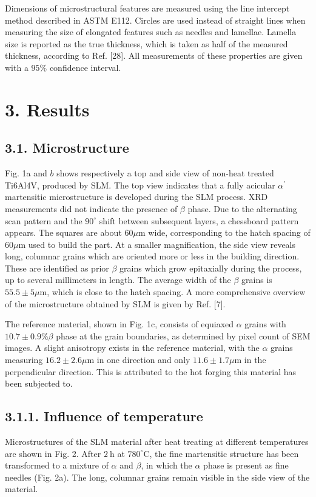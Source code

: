 \documentclass[10pt]{article}
\begin{document}
Dimensions of microstructural features are measured using the line intercept method described in ASTM E112. Circles are used instead of straight lines when measuring the size of elongated features such as needles and lamellae. Lamella size is reported as the true thickness, which is taken as half of the measured thickness, according to Ref. [28]. All measurements of these properties are given with a $95 \%$ confidence interval.

\section*{3. Results}
\subsection*{3.1. Microstructure}
Fig. 1a and $b$ shows respectively a top and side view of non-heat treated Ti6Al4V, produced by SLM. The top view indicates that a fully acicular $\alpha^{\prime}$ martensitic microstructure is developed during the SLM process. XRD measurements did not indicate the presence of $\beta$ phase. Due to the alternating scan pattern and the $90^{\circ}$ shift between subsequent layers, a chessboard pattern appears. The squares are about $60 \mu \mathrm{m}$ wide, corresponding to the hatch spacing of $60 \mu \mathrm{m}$ used to build the part. At a smaller magnification, the side view reveals long, columnar grains which are oriented more or less in the building direction. These are identified as prior $\beta$ grains which grow epitaxially during the process, up to several millimeters in length. The average width of the $\beta$ grains is $55.5 \pm 5 \mu \mathrm{m}$, which is close to the hatch spacing. A more comprehensive overview of the microstructure obtained by SLM is given by Ref. [7].

The reference material, shown in Fig. 1c, consists of equiaxed $\alpha$ grains with $10.7 \pm 0.9 \% \beta$ phase at the grain boundaries, as determined by pixel count of SEM images. A slight anisotropy exists in the reference material, with the $\alpha$ grains measuring $16.2 \pm 2.6 \mu \mathrm{m}$ in one direction and only $11.6 \pm 1.7 \mu \mathrm{m}$ in the perpendicular direction. This is attributed to the hot forging this material has been subjected to.

\subsection*{3.1.1. Influence of temperature}
Microstructures of the SLM material after heat treating at different temperatures are shown in Fig. 2. After $2 \mathrm{~h}$ at $780^{\circ} \mathrm{C}$, the fine martensitic structure has been transformed to a mixture of $\alpha$ and $\beta$, in which the $\alpha$ phase is present as fine needles (Fig. 2a). The long, columnar grains remain visible in the side view of the material.
\end{document}
